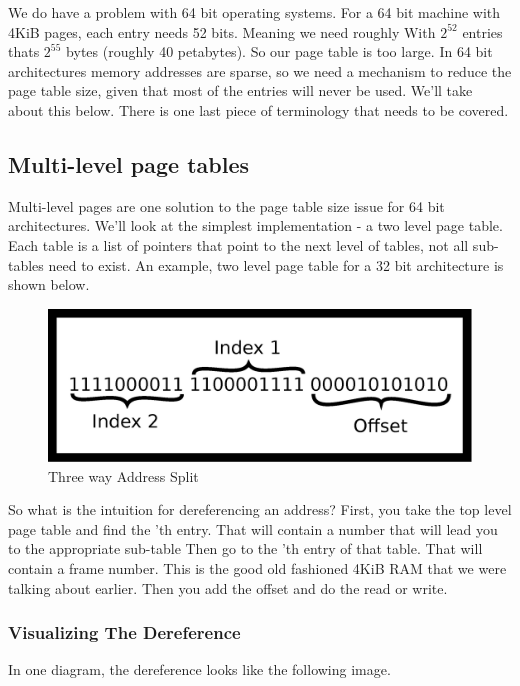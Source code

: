 We do have a problem with 64 bit operating systems.
For a 64 bit machine with 4KiB pages, each entry needs 52 bits.
Meaning we need roughly
With $2^{52}$ entries thats $2^{55}$ bytes (roughly 40 petabytes).
So our page table is too large.
In 64 bit architectures memory addresses are sparse, so we need a mechanism to reduce the page table size, given that most of the entries will never be used.
We'll take about this below. There is one last piece of terminology that needs to be covered.

\subsection{Multi-level page tables}

Multi-level pages are one solution to the page table size issue for 64 bit architectures.
We'll look at the simplest implementation - a two level page table.
Each table is a list of pointers that point to the next level of tables, not all sub-tables need to exist.
An example, two level page table for a 32 bit architecture is shown below.

\begin{figure}[H]
\centering
\includegraphics[width=.5\textwidth]{ipc/drawings/three_address_split.eps}
\caption{Three way Address Split}
\end{figure}

So what is the intuition for dereferencing an address?
First, you take the top level page table and find the 'th entry.
That will contain a number that will lead you to the appropriate sub-table
Then go to the 'th entry of that table.
That will contain a frame number.
This is the good old fashioned 4KiB RAM that we were talking about earlier.
Then you add the offset and do the read or write.

\subsubsection{Visualizing The Dereference}

In one diagram, the dereference looks like the following image.


